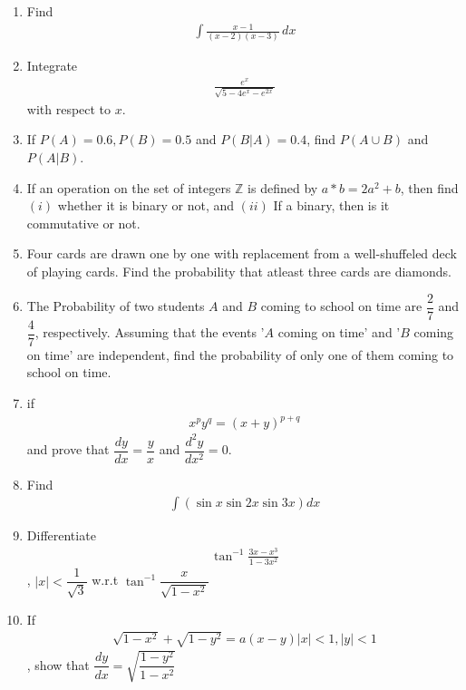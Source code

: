 \documentclass[12pt,-letter paper]{article}
\providecommand{\brak}[1]{\ensuremath{\left(#1\right)}}
\begin{document}
\begin{enumerate}
\item Find \begin{align*}\int \frac{x-1}{(x-2)(x-3)}\,dx\end{align*}

\item Integrate \begin{align}\frac{e^x}{\sqrt{5-4e^x-e^{2x}}}\end{align} with respect to $x$.

\item If $P\brak{A}=0.6, P\brak{B}=0.5$ and $P\brak{B|A}=0.4$, find $P\brak{A \cup B}$ and $P\brak{A|B}$. 

\item If an operation on the set of integers $\mathbb{Z}$ is defined by $a*b=2a^2+b$, then find $(i)$ whether it is binary or not,  and $(ii)$ If a binary, then is it commutative or not.


\item Four cards are drawn one by one with replacement from a well-shuffeled deck of playing cards. Find the probability that atleast three cards are diamonds.

\item The Probability of two students $A$ and $B$ coming to school on time are $\dfrac{2}{7}$ and $\dfrac{4}{7}$, respectively. Assuming that the events '$A$ coming on time' and '$B$ coming on time' are independent, find the probability of only one of them coming to school on time.

\item if \begin{align*}x^py^q=(x+y)^{p+q}\end{align*} and prove that $\dfrac{dy}{dx}=\dfrac{y}{x}$ and $\dfrac{d^2y}{dx^2}=0$.
		
	\item Find \begin{align*}\int \brak{\sin x \sin 2x \sin 3x} dx\end{align*}

\item Differentiate \begin{align*}\tan^{-1}\frac{3x-x^3}{1-3x^2}\end{align*}, $|x|<\dfrac{1}{\sqrt{3}}$ w.r.t $\tan^{-1}\dfrac{x}{\sqrt{1-x^2}}$

\item If \begin{align*}\sqrt{1-x^2}+\sqrt{1-y^2}=a\brak{x-y} |x|<1,|y|<1\end{align*}, show that $\dfrac{dy}{dx}=\sqrt{\dfrac{1-y^2}{1-x^2}}$


\end{enumerate}
\end{document}
